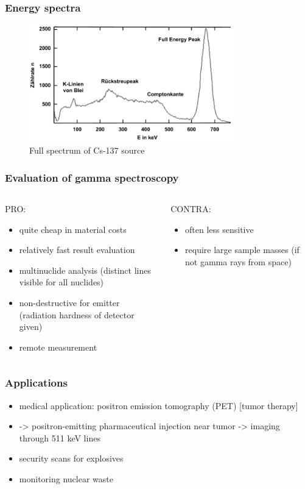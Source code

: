 \documentclass[aspectratio=1610, 12pt]{beamer}
\begin{document}
\begin{frame}\frametitle{Energy spectra}
  \begin{figure}
    \includegraphics[width=0.8\textwidth]{plots/full_spec.png}
    \caption{Full spectrum of Cs-137 source}
  \end{figure}
\end{frame}

\begin{frame}\frametitle{Evaluation of gamma spectroscopy}
  \begin{columns}
    \begin{column}[c]{0.48\textwidth}
      PRO:
      \begin{itemize}
        \item quite cheap in material costs
        \item relatively fast result evaluation
        \item multinuclide analysis (distinct lines visible for all nuclides)
        \item non-destructive for emitter (radiation hardness of detector given)
        \item remote measurement
      \end{itemize}
    \end{column}
    \begin{column}[c]{0.48\textwidth}
      CONTRA:
      \begin{itemize}
        \item often less sensitive
        \item require large sample masses (if not gamma rays from space)
      \end{itemize}
    \end{column}
  \end{columns}
\end{frame}

\begin{frame}\frametitle{Applications}
  \begin{itemize}
    \item medical application: positron emission tomography (PET) [tumor therapy]
    \item -> positron-emitting pharmaceutical injection near tumor -> imaging through 511 keV lines
    \item security scans for explosives
    \item monitoring nuclear waste
  \end{itemize}
\end{frame}
\end{document}
